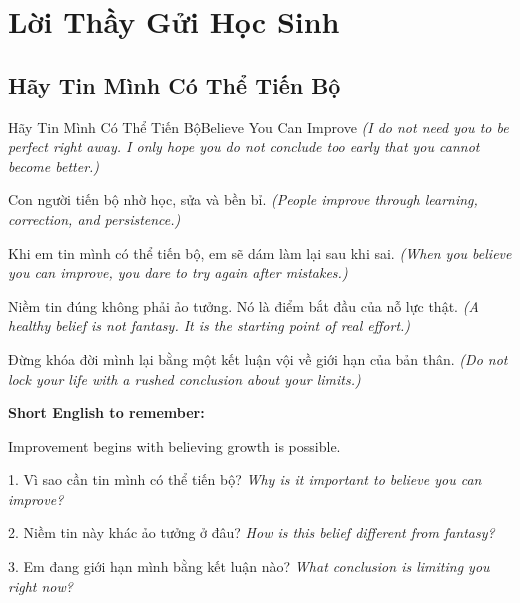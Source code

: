 \chapter{Lời Thầy Gửi Học Sinh}

\section{Hãy Tin Mình Có Thể Tiến Bộ}
\begin{truyen}{Hãy Tin Mình Có Thể Tiến Bộ}{Believe You Can Improve}
\textit{(I do not need you to be perfect right away. I only hope you do not conclude too early that you cannot become better.)}

Con người tiến bộ nhờ học, sửa và bền bỉ.
\textit{(People improve through learning, correction, and persistence.)}

Khi em tin mình có thể tiến bộ, em sẽ dám làm lại sau khi sai.
\textit{(When you believe you can improve, you dare to try again after mistakes.)}

Niềm tin đúng không phải ảo tưởng. Nó là điểm bắt đầu của nỗ lực thật.
\textit{(A healthy belief is not fantasy. It is the starting point of real effort.)}
\end{truyen}

\begin{baihoc}
Đừng khóa đời mình lại bằng một kết luận vội về giới hạn của bản thân.
\textit{(Do not lock your life with a rushed conclusion about your limits.)}
\end{baihoc}

\begin{ghinhoanh}
\textbf{Short English to remember:}

Improvement begins with believing growth is possible.

\end{ghinhoanh}

\begin{tuhocnhanh}
1. Vì sao cần tin mình có thể tiến bộ? \textit{Why is it important to believe you can improve?}

2. Niềm tin này khác ảo tưởng ở đâu? \textit{How is this belief different from fantasy?}

3. Em đang giới hạn mình bằng kết luận nào? \textit{What conclusion is limiting you right now?}
\end{tuhocnhanh}
\ngancach

